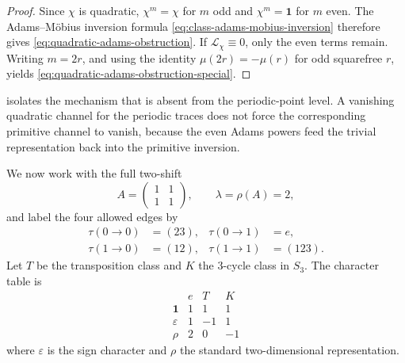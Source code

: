 \begin{proof}
  Since \(\chi\) is quadratic, \(\chi^m=\chi\) for \(m\) odd and
  \(\chi^m=\mathbf 1\) for \(m\) even. The Adams--M\"obius inversion
  formula \eqref{eq:class-adams-mobius-inversion} therefore gives
  \eqref{eq:quadratic-adams-obstruction}. If \(\mathcal L_\chi\equiv 0\),
  only the even terms remain. Writing \(m=2r\), and using the identity
  \(\mu(2r)=-\mu(r)\) for odd squarefree \(r\), yields
  \eqref{eq:quadratic-adams-obstruction-special}.
\end{proof}

\begin{remark}
   isolates the mechanism that is
  absent from the periodic-point level. A vanishing quadratic channel
  for the periodic traces does not force the corresponding primitive
  channel to vanish, because the even Adams powers feed the trivial
  representation back into the primitive inversion.
\end{remark}

We now work with the full two-shift
\[
  A=
  \begin{pmatrix}
    1 & 1 \\
    1 & 1
  \end{pmatrix},
  \qquad
  \lambda=\rho(A)=2,
\]
and label the four allowed edges by
\begin{equation}\label{eq:s3-example-edge-labels}
  \begin{aligned}
    \tau(0\to 0)&=(23), & \tau(0\to 1)&=e, \\
    \tau(1\to 0)&=(12), & \tau(1\to 1)&=(123).
  \end{aligned}
\end{equation}
Let \(T\) be the transposition class and \(K\) the \(3\)-cycle class in
\(S_3\). The character table is
\begin{equation}\label{eq:s3-character-table}
  \begin{array}{c|ccc}
    & e & T & K \\ \hline
    \mathbf 1 & 1 & 1 & 1 \\
    \varepsilon & 1 & -1 & 1 \\
    \rho & 2 & 0 & -1
  \end{array}
\end{equation}
where \(\varepsilon\) is the sign character and \(\rho\) the standard
two-dimensional representation.

